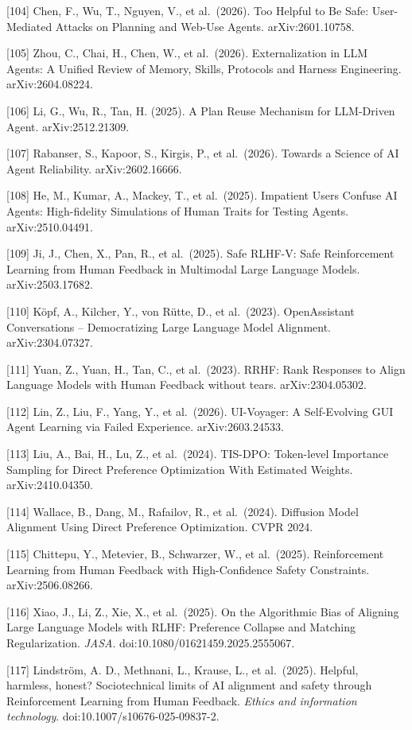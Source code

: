 {[}104{]} Chen, F., Wu, T., Nguyen, V., et al.~(2026). Too Helpful to Be Safe: User-Mediated Attacks on Planning and Web-Use Agents. arXiv:2601.10758.

{[}105{]} Zhou, C., Chai, H., Chen, W., et al.~(2026). Externalization in LLM Agents: A Unified Review of Memory, Skills, Protocols and Harness Engineering. arXiv:2604.08224.

{[}106{]} Li, G., Wu, R., Tan, H. (2025). A Plan Reuse Mechanism for LLM-Driven Agent. arXiv:2512.21309.

{[}107{]} Rabanser, S., Kapoor, S., Kirgis, P., et al.~(2026). Towards a Science of AI Agent Reliability. arXiv:2602.16666.

{[}108{]} He, M., Kumar, A., Mackey, T., et al.~(2025). Impatient Users Confuse AI Agents: High-fidelity Simulations of Human Traits for Testing Agents. arXiv:2510.04491.

{[}109{]} Ji, J., Chen, X., Pan, R., et al.~(2025). Safe RLHF-V: Safe Reinforcement Learning from Human Feedback in Multimodal Large Language Models. arXiv:2503.17682.

{[}110{]} Köpf, A., Kilcher, Y., von Rütte, D., et al.~(2023). OpenAssistant Conversations -- Democratizing Large Language Model Alignment. arXiv:2304.07327.

{[}111{]} Yuan, Z., Yuan, H., Tan, C., et al.~(2023). RRHF: Rank Responses to Align Language Models with Human Feedback without tears. arXiv:2304.05302.

{[}112{]} Lin, Z., Liu, F., Yang, Y., et al.~(2026). UI-Voyager: A Self-Evolving GUI Agent Learning via Failed Experience. arXiv:2603.24533.

{[}113{]} Liu, A., Bai, H., Lu, Z., et al.~(2024). TIS-DPO: Token-level Importance Sampling for Direct Preference Optimization With Estimated Weights. arXiv:2410.04350.

{[}114{]} Wallace, B., Dang, M., Rafailov, R., et al.~(2024). Diffusion Model Alignment Using Direct Preference Optimization. CVPR 2024.

{[}115{]} Chittepu, Y., Metevier, B., Schwarzer, W., et al.~(2025). Reinforcement Learning from Human Feedback with High-Confidence Safety Constraints. arXiv:2506.08266.

{[}116{]} Xiao, J., Li, Z., Xie, X., et al.~(2025). On the Algorithmic Bias of Aligning Large Language Models with RLHF: Preference Collapse and Matching Regularization. \emph{JASA}. doi:10.1080/01621459.2025.2555067.

{[}117{]} Lindström, A. D., Methnani, L., Krause, L., et al.~(2025). Helpful, harmless, honest? Sociotechnical limits of AI alignment and safety through Reinforcement Learning from Human Feedback. \emph{Ethics and information technology}. doi:10.1007/s10676-025-09837-2.

